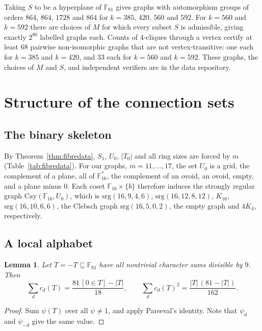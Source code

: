 \documentclass[11pt]{amsart}
\newtheorem{lemma}[theorem]{Lemma}
\theoremstyle{definition}
\newcommand{\F}{\mathbb{F}}
\newcommand{\srg}{\mathrm{srg}}
\newcommand{\Cay}{\mathrm{Cay}}
\begin{document}
Taking $S$ to be a hyperplane of $\F_{81}$ gives graphs with automorphism groups of orders $864$, $864$, $1728$ and $864$ for $k=385$, $420$, $560$ and $592$. For $k=560$ and $k=592$ there are choices of $M$ for which every subset $S$ is admissible, giving exactly $2^{80}$ labelled graphs each. Counts of $4$-cliques through a vertex certify at least $68$ pairwise non-isomorphic graphs that are not vertex-transitive: one each for $k=385$ and $k=420$, and $33$ each for $k=560$ and $k=592$. These graphs, the choices of $M$ and $S$, and independent verifiers are in the data repository.

\section{Structure of the connection sets}\label{sec:shared}

\subsection{The binary skeleton}
By Theorem~\ref{thm:fibredata}, $S_1$, $U_0$, $|T_0|$ and all ring sizes are forced by $m$ (Table~\ref{tab:fibredata}). For our graphs, $m=11,\dots,17$, the set $U_0$ is a grid, the complement of a plane, all of $\F_{16}^*$, the complement of an ovoid, an ovoid, empty, and a plane minus $0$. Each coset $\F_{16}\times\{b\}$ therefore induces the strongly regular graph $\Cay(\F_{16},U_0)$, which is $\srg(16,9,4,6)$, $\srg(16,12,8,12)$, $K_{16}$, $\srg(16,10,6,6)$, the Clebsch graph $\srg(16,5,0,2)$, the empty graph and $4K_4$, respectively.

\subsection{A local alphabet}\label{sec:alphabet}

\begin{lemma}\label{lem:alphabet}
Let $T=-T\subseteq\F_{81}$ have all nontrivial character sums divisible by $9$. Then
\[
\sum_d c_d(T)=\frac{81\,[0\in T]-|T|}{18},\qquad \sum_d c_d(T)^2=\frac{|T|\,(81-|T|)}{162}.
\]
\end{lemma}

\begin{proof}
Sum $\psi(T)$ over all $\psi\ne1$, and apply Parseval's identity. Note that $\psi_d$ and $\psi_{-d}$ give the same value.
\end{proof}
\end{document}
